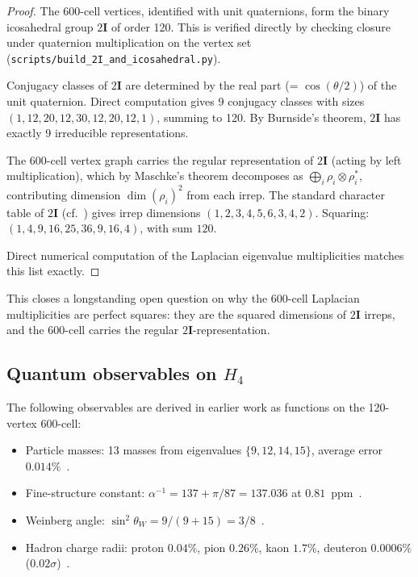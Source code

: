 \documentclass[12pt]{article}
\newcommand{\twoI}{2\mathbf{I}}
\begin{document}
\begin{proof}
The 600-cell vertices, identified with unit quaternions, form the binary icosahedral group $\twoI$ of order 120. This is verified directly by checking closure under quaternion multiplication on the vertex set (\texttt{scripts/build\_2I\_and\_icosahedral.py}).

Conjugacy classes of $\twoI$ are determined by the real part (= $\cos(\theta/2)$) of the unit quaternion. Direct computation gives 9 conjugacy classes with sizes $(1, 12, 20, 12, 30, 12, 20, 12, 1)$, summing to 120. By Burnside's theorem, $\twoI$ has exactly 9 irreducible representations.

The 600-cell vertex graph carries the regular representation of $\twoI$ (acting by left multiplication), which by Maschke's theorem decomposes as $\bigoplus_i \rho_i \otimes \rho_i^*$, contributing dimension $\dim(\rho_i)^2$ from each irrep. The standard character table of $\twoI$ (cf.~\citep{Conway1985Atlas}) gives irrep dimensions $(1, 2, 3, 4, 5, 6, 3, 4, 2)$. Squaring: $(1, 4, 9, 16, 25, 36, 9, 16, 4)$, with sum $120$.

Direct numerical computation of the Laplacian eigenvalue multiplicities matches this list exactly.
\end{proof}

This closes a longstanding open question on why the 600-cell Laplacian multiplicities are perfect squares: they are the squared dimensions of $\twoI$ irreps, and the 600-cell carries the regular $\twoI$-representation.

\subsection{Quantum observables on $H_4$}

The following observables are derived in earlier work as functions on the 120-vertex 600-cell:
\begin{itemize}
    \item Particle masses: 13 masses from eigenvalues $\{9, 12, 14, 15\}$, average error $0.014\%$~\citep{SmartV}.
    \item Fine-structure constant: $\alpha^{-1} = 137 + \pi/87 = 137.036$ at $0.81$~ppm~\citep{SmartXXII}.
    \item Weinberg angle: $\sin^2\theta_W = 9/(9+15) = 3/8$~\citep{SmartXXII}.
    \item Hadron charge radii: proton $0.04\%$, pion $0.26\%$, kaon $1.7\%$, deuteron $0.0006\%$ ($0.02\sigma$)~\citep{SmartXXXII}.
\end{itemize}
\end{document}
